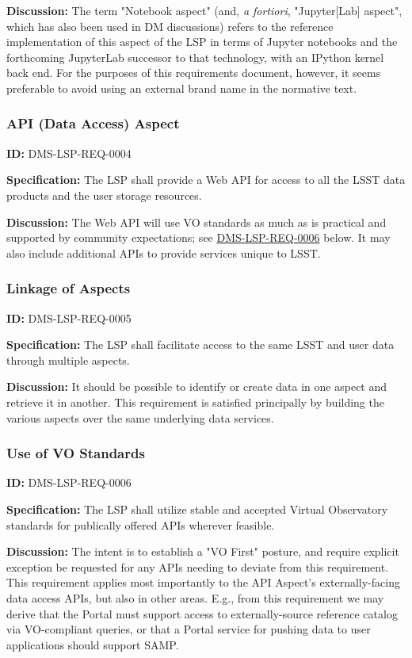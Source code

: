 \documentclass[SE,toc,lsstdraft]{lsstdoc}
\begin{document}
\textbf{Discussion:}
The term "Notebook aspect" (and, \textit{a fortiori}, "Jupyter[Lab] aspect", which has also been used in DM discussions) refers to the reference implementation of this aspect of the LSP in terms of Jupyter notebooks and the forthcoming JupyterLab successor to that technology, with an IPython kernel back end. For the purposes of this requirements document, however, it seems preferable to avoid using an external brand name in the normative text.

\subsubsection{API (Data Access) Aspect}

\label{DMS-LSP-REQ-0004}
\textbf{ID:} DMS-LSP-REQ-0004

\textbf{Specification:}
The LSP shall provide a Web API for access to all the LSST data products and the user storage resources.

\textbf{Discussion:}
The Web API will use VO standards as much as is practical and supported by community expectations; see \hyperref[DMS-LSP-REQ-0006]{DMS-LSP-REQ-0006} below.  It may also include additional APIs to provide services unique to LSST.

\subsubsection{Linkage of Aspects}

\label{DMS-LSP-REQ-0005}
\textbf{ID:} DMS-LSP-REQ-0005

\textbf{Specification:}
The LSP shall facilitate access to the same LSST and user data through multiple aspects.

\textbf{Discussion:}
It should be possible to identify or create data in one aspect and retrieve it in another.  This requirement is satisfied principally by building the various aspects over the same underlying data services.

\subsubsection{Use of VO Standards}

\label{DMS-LSP-REQ-0006}
\textbf{ID:} DMS-LSP-REQ-0006

\textbf{Specification:}
The LSP shall utilize stable and accepted Virtual Observatory standards for publically offered APIs wherever feasible.

\textbf{Discussion:}
The intent is to establish a "VO First" posture, and require explicit exception be requested for any APIs needing to deviate from this requirement.
This requirement applies most importantly to the API Aspect's externally-facing data access APIs, but also in other areas.
E.g., from this requirement we may derive that the Portal must support access to externally-source reference catalog via VO-compliant queries, or that a Portal service for pushing data to user applications should support SAMP.
\end{document}
